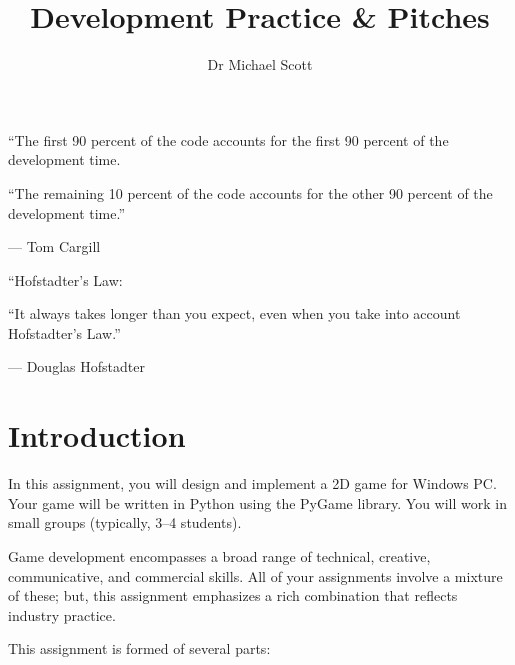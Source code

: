 \documentclass{../../fal_assignment}
\title{Development Practice \& Pitches}
\author{Dr Michael Scott}
\begin{document}
\maketitle

\begin{marginquote}
    ``The first 90 percent of the code accounts for the first 90 percent of the development time.
    
    ``The remaining 10 percent of the code accounts for the other 90 percent of the development time.''
    
    --- Tom Cargill
    
    \marginquoterule
    
    ``Hofstadter's Law:
    
    ``It always takes longer than you expect, even when you take into account Hofstadter's Law.''
    
    --- Douglas Hofstadter
\end{marginquote}

\section*{Introduction}

In this assignment, you will design and implement a 2D game for Windows PC. Your game will be written in Python using the PyGame library. You will work in small groups (typically, 3--4 students).

Game development encompasses a broad range of technical, creative, communicative, and commercial skills. All of your assignments involve a mixture of these; but, this assignment emphasizes a rich combination that reflects industry practice.

This assignment is formed of several parts:
\end{document}
